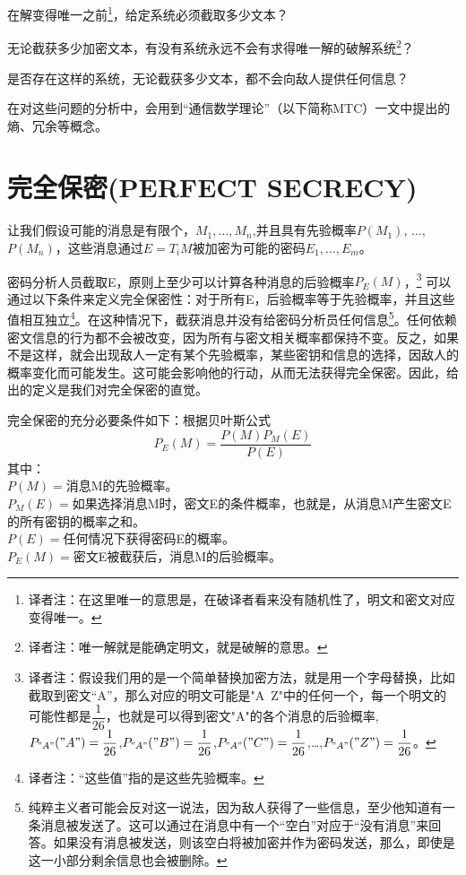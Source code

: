 \documentclass[]{article}
\begin{document}
在解变得唯一之前\footnote{译者注：在这里唯一的意思是，在破译者看来没有随机性了，明文和密文对应变得唯一。}，给定系统必须截取多少文本？\par

无论截获多少加密文本，有没有系统永远不会有求得唯一解的破解系统\footnote{译者注：唯一解就是能确定明文，就是破解的意思。}？\par

是否存在这样的系统，无论截获多少文本，都不会向敌人提供任何信息？\par

在对这些问题的分析中，会用到“通信数学理论”（以下简称MTC）一文中提出的熵、冗余等概念。

\newpage
%   
%

\section{完全保密(PERFECT SECRECY)}

让我们假设可能的消息是有限个，$M_1,\ldots,M_n$,并且具有先验概率$P(M_1)$, $\ldots$, $P(M_n)$，这些消息通过$E=T_i M$被加密为可能的密码$E_1,\ldots,E_m$。

密码分析人员截取E，原则上至少可以计算各种消息的后验概率$P_E(M)$，\footnote{译者注：假设我们用的是一个简单替换加密方法，就是用一个字母替换，比如截取到密文“A”，那么对应的明文可能是"A~Z"中的任何一个，每一个明文的可能性都是$\dfrac{1}{26}$，也就是可以得到密文"A"的各个消息的后验概率,$P_{"A"}("A")=\dfrac{1}{26}$,$P_{"A"}("B")=\dfrac{1}{26}$,$P_{"A"}("C")=\dfrac{1}{26}$,\ldots,$P_{"A"}("Z")=\dfrac{1}{26}$。}
可以通过以下条件来定义完全保密性：对于所有E，后验概率等于先验概率，并且这些值相互独立\footnote{译者注：“这些值”指的是这些先验概率。}。在这种情况下，截获消息并没有给密码分析员任何信息\footnote{纯粹主义者可能会反对这一说法，因为敌人获得了一些信息，至少他知道有一条消息被发送了。这可以通过在消息中有一个“空白”对应于“没有消息”来回答。如果没有消息被发送，则该空白将被加密并作为密码发送，那么，即使是这一小部分剩余信息也会被删除。}。任何依赖密文信息的行为都不会被改变，因为所有与密文相关概率都保持不变。反之，如果不是这样，就会出现敌人一定有某个先验概率，某些密钥和信息的选择，因敌人的概率变化而可能发生。这可能会影响他的行动，从而无法获得完全保密。因此，给出的定义是我们对完全保密的直觉。

完全保密的充分必要条件如下：根据贝叶斯公式
\[P_E(M)=\dfrac{P(M)P_M(E)}{P(E)}\]
其中：\\
$P(M)=$消息M的先验概率。\\
$P_M(E)=$如果选择消息M时，密文E的条件概率，也就是，从消息M产生密文E的所有密钥的概率之和。\\
$P(E)=$任何情况下获得密码E的概率。\\
$P_E(M)=$密文E被截获后，消息M的后验概率。\par
\end{document}
